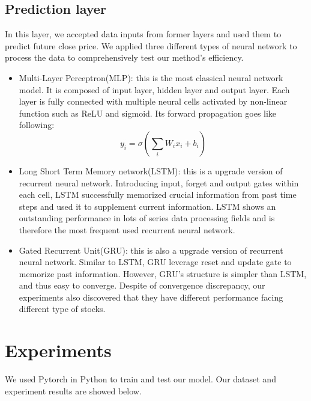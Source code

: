 \documentclass[runningheads]{llncs}
\begin{document}
\subsection{Prediction layer}
In this layer, we accepted data inputs from former layers and used them to predict future close price. We applied three different types of neural network to process the data to comprehensively test our method's efficiency.
\begin{itemize}
    \item Multi-Layer Perceptron(MLP): this is the most classical neural network model. It is composed of input layer, hidden layer and output layer. Each layer is fully connected with multiple neural cells activated by non-linear function such as ReLU and sigmoid. Its forward propagation goes like following:
    \begin{equation}
        y_i = \sigma(\sum_{i}W_ix_i+b_i)
    \end{equation}
    \item Long Short Term Memory network(LSTM): this is a upgrade version of recurrent neural network. Introducing input, forget and output gates within each cell, LSTM successfully memorized crucial information from past time steps and used it to supplement current information. LSTM shows an outstanding performance in lots of series data processing fields and is therefore the most frequent used recurrent neural network.
    \item Gated Recurrent Unit(GRU): this is also a upgrade version of recurrent neural network. Similar to LSTM, GRU leverage reset and update gate to memorize past information. However, GRU's structure is simpler than LSTM, and thus easy to converge. Despite of convergence discrepancy, our experiments also discovered that they have different performance facing different type of stocks. 
\end{itemize}


\section{Experiments}
We used Pytorch in Python to train and test our model. Our dataset and experiment results are showed below.
\end{document}
